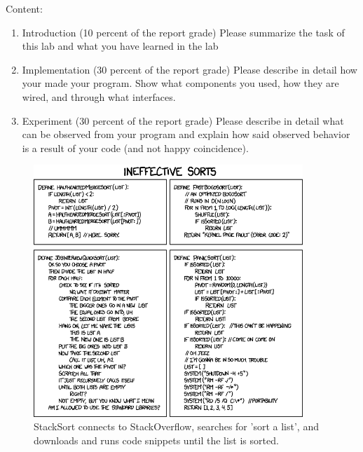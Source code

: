 \documentclass[letterpaper,12pt]{article}
\begin{document}
Content:
\begin{enumerate}
   \item Introduction (10 percent of the report grade) Please summarize the task of this lab and what you have learned in the lab
   \item Implementation (30 percent of the report grade) Please describe in detail how your made your program. Show what components you used, how they are wired, and through what interfaces.
   \item Experiment (30 percent of the report grade) Please describe in detail what can be observed from your program and explain how said observed behavior is a result of your code (and not happy coincidence).
\end{enumerate}

\begin{figure}[ht!]
	\centering
	\includegraphics[width=4in]{ineffective_sorts.png}
    \caption*{StackSort connects to StackOverflow, searches for 'sort a list', and downloads and runs code snippets until the list is sorted.}
\end{figure}
\end{document}
